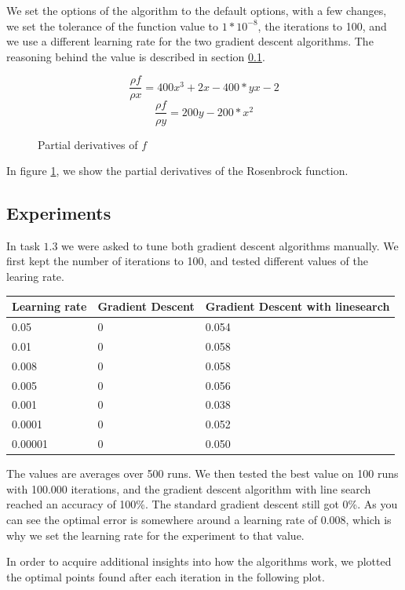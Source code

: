 \documentclass{article}
\begin{document}
We set the options of the algorithm to the default options, with a few changes, we set the tolerance of the function value to $1*10^{-8}$, the iterations to 100, and we use a different learning rate for the two gradient descent algorithms. The reasoning behind the value is described in section \ref{sec:experiments}.

\begin{figure}[H]
\[\frac{\rho f}{\rho x} = 400x^3 + 2x - 400*yx - 2\]
\[\frac{\rho f}{\rho y} = 200y - 200*x^2\]
\caption{Partial derivatives of $f$}
\label{fig:partdiv}
\end{figure}

In figure \ref{fig:partdiv}, we show the partial derivatives of the Rosenbrock function.

\subsection{Experiments}
\label{sec:experiments}
In task $1.3$ we were asked to tune both gradient descent algorithms manually. We first kept the number of iterations to 100, and tested different values of the learing rate.

\begin{table}[H]
	\centering
		\begin{tabular}{l|l|l}
		Learning rate & Gradient Descent & Gradient Descent with linesearch \\
		\hline
		0.05 & 0 & 0.054 \\
		0.01 & 0 & 0.058 \\
		0.008 & 0 & 0.058 \\
		0.005 & 0 & 0.056 \\
		0.001 & 0 & 0.038 \\
		0.0001 & 0 & 0.052 \\
		0.00001 & 0 & 0.050 \\
		\end{tabular}
\end{table}
    
The values are averages over 500 runs. We then tested the best value on 100 runs with 100.000 iterations, and the gradient descent algorithm with line search reached an accuracy of 100\%. The standard gradient descent still got 0\%.
As you can see the optimal error is somewhere around a learning rate of 0.008, which is why we set the learning rate for the experiment to that value.

In order to acquire additional insights into how the algorithms work, we plotted the optimal points found after each iteration in the following plot.
\end{document}
